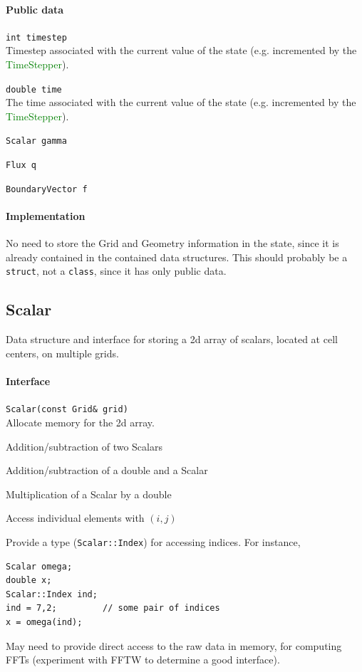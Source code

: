 \documentclass[11pt]{article}
\def\class#1{\textcolor{green}{\ttfamily\small #1}} %
\let\code\lstinline
\begin{document}
\paragraph{Public data}
\begin{description}
	\item \code|int timestep|\\
		Timestep associated with the current value of the state (e.g. incremented by the \class{TimeStepper}).
	\item \code|double time|\\
		The time associated with the current value of the state (e.g. incremented by the \class{TimeStepper}).
	\item \code|Scalar gamma|\\
	\item \code|Flux q|\\
	\item \code|BoundaryVector f|
\end{description}

\paragraph{Implementation}
No need to store the Grid and Geometry information in the state, since it is already contained in the contained data structures.  This should probably be a \code|struct|, not a \code|class|, since it has only public data.

\subsection{Scalar}
Data structure and interface for storing a 2d array of scalars, located at cell centers, on multiple grids.

\paragraph{Interface}
\begin{description}
	\item \code|Scalar(const Grid& grid)|\\
	Allocate memory for the 2d array.
	\item Addition/subtraction of two Scalars
	\item Addition/subtraction of a double and a Scalar
	\item Multiplication of a Scalar by a double
	\item Access individual elements with $(i,j)$
	\item Provide a type (\code|Scalar::Index|) for accessing indices.  For instance,
	\begin{lstlisting}
Scalar omega;
double x;
Scalar::Index ind;
ind = 7,2;         // some pair of indices
x = omega(ind);
	\end{lstlisting}
	\item May need to provide direct access to the raw data in memory, for computing FFTs (experiment with FFTW to determine a good interface).
\end{description}
\end{document}
